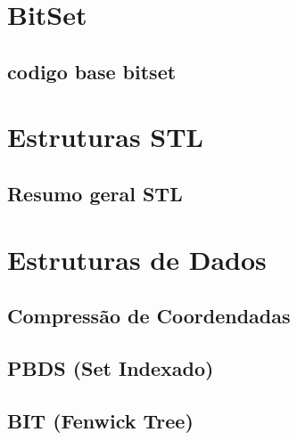% 
\section{BitSet}

\subsection{codigo base bitset}


\section{Estruturas STL}

\subsection{Resumo geral STL}


\section{Estruturas de Dados}

\subsection{Compressão de Coordendadas}


\subsection{PBDS (Set Indexado)}


\subsection{BIT (Fenwick Tree)}


